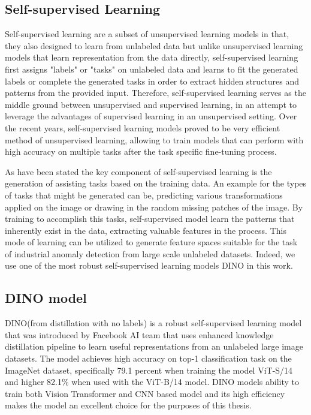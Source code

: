 \subsection{Self-supervised Learning}
\label{self-supervised learning}

Self-supervised learning are a subset of unsupervised learning models in that, they also designed to learn from unlabeled data but unlike unsupervised learning models that learn representation from the data directly, self-supervised learning first assigns "labels" or "tasks" on unlabeled data and learns to fit the generated labels or complete the generated tasks in order to extract hidden structures and patterns from the provided input. Therefore, self-supervised learning serves as the middle ground between unsupervised and supervised learning, in an attempt to leverage the advantages of supervised learning in an unsupervised setting. Over the recent years, self-supervised learning models proved to be very efficient method of unsupervised learning, allowing to train models that can perform with high accuracy on multiple tasks after the task specific fine-tuning process.

As have been stated the key component of self-supervised learning is the generation of assisting tasks based on the training data. An example for the types of tasks that might be generated can be, predicting various transformations applied on the image or drawing in the random missing patches of the image. By training to accomplish this tasks, self-supervised model learn the patterns that inherently exist in the data, extracting valuable features in the process. This mode of learning can be utilized to generate feature spaces suitable for the task of industrial anomaly detection from large scale unlabeled datasets. Indeed, we use one of the most robust self-supervised learning models DINO in this work.

\subsection{DINO model}
\label{dino}

DINO(from distillation with no labels) is a robust self-supervised learning model that was introduced by Facebook AI team that uses enhanced knowledge distillation pipeline to learn useful representations from an unlabeled large image datasets. The model achieves high accuracy on top-1 classification task on the ImageNet dataset, specifically 79.1 percent when training the model ViT-S/14 and higher 82.1\% when used with the ViT-B/14 model. DINO models ability to train both Vision Transformer and CNN based model and its high efficiency makes the model an excellent choice for the purposes of this thesis.

